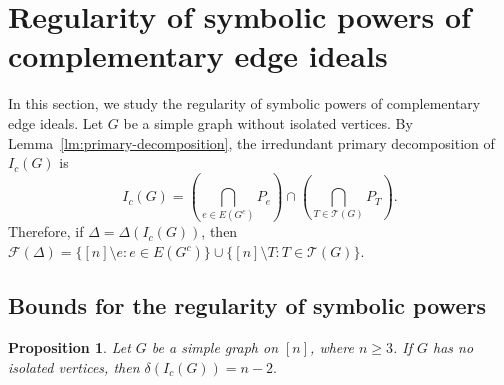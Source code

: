 \documentclass[12pt]{amsart}
\newtheorem{proposition}{Proposition}[section]
\begin{document}
\section{Regularity of symbolic powers of complementary edge ideals}\label{sec:symbolic-regularity}
In this section, we study the regularity of symbolic powers of complementary edge ideals. Let $G$ be a simple graph without isolated vertices. By Lemma~\ref{lm:primary-decomposition}, the irredundant primary decomposition of $I_c(G)$ is
\begin{equation}\label{eq:primary-section3}
I_c(G)=\left(\bigcap_{e\in E(G^c)}P_e\right)\cap\left(\bigcap_{T\in\mathcal T(G)}P_T\right).
\end{equation}
Therefore, if $\Delta=\Delta(I_c(G))$, then $\mathcal F(\Delta)=\{[n]\setminus e:e\in E(G^c)\}\cup\{[n]\setminus T:T\in\mathcal T(G)\}.$

\subsection{Bounds for the regularity of symbolic powers}
\begin{proposition}\label{prop:delta-no-isolates}
Let $G$ be a simple graph on $[n]$, where $n\ge3$. If $G$ has no isolated vertices, then
$\delta(I_c(G))=n-2.$
\end{proposition}
\end{document}
